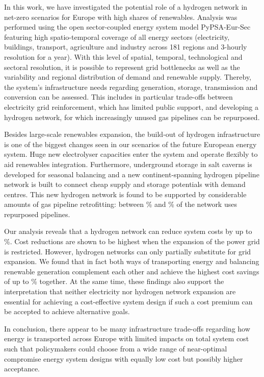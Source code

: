 In this work, we have investigated the potential role of a hydrogen network in net-zero
\co scenarios for Europe with high shares of renewables. Analysis was performed
using the open sector-coupled energy system model PyPSA-Eur-Sec featuring high
spatio-temporal coverage of all energy sectors (electricity, buildings,
transport, agriculture and industry across 181 regions and 3-hourly resolution
for a year). With this level of spatial, temporal, technological and sectoral
resolution, it is possible to represent grid bottlenecks as well as the
variability and regional distribution of demand and renewable supply. Thereby,
the system's infrastructure needs regarding generation, storage, transmission
and conversion can be assessed. This includes in particular trade-offs between
electricity grid reinforcement, which has limited public support, and developing
a hydrogen network, for which increasingly unused gas pipelines can be
repurposed.

Besides large-scale renewables expansion, the build-out of hydrogen
infrastructure is one of the biggest changes seen in our scenarios of the future
European energy system. Huge new electrolyser capacities enter the system and
operate flexibly to aid renewables integration. Furthermore, underground storage
in salt caverns is developed for seasonal balancing and a new continent-spanning
hydrogen pipeline network is built to connect cheap supply and storage
potentials with demand centres. This new hydrogen network is found to be
supported by considerable amounts of gas pipeline retrofitting: between \minretroshare\% and
\maxretroshare\% of the network uses repurposed pipelines.

Our analysis reveals that a hydrogen network can reduce system costs by up to
\maxhybenefitrel\%. Cost reductions are shown to be highest when the expansion of the power grid is
restricted. However, hydrogen networks can only partially substitute for grid
expansion. We found that in fact both ways of transporting energy and balancing
renewable generation complement each other and achieve the highest cost savings
of up to \gridbenefitrel\% together. At the same time, these findings also support the
interpretation that neither electricity nor hydrogen network expansion are
essential for achieving a cost-effective system design if such a cost premium
can be accepted to achieve alternative goals.

In conclusion, there appear to be many infrastructure trade-offs regarding how
energy is transported across Europe with limited impacts on total system cost
such that policymakers could choose from a wide range of near-optimal compromise
energy system designs with equally low cost but possibly higher acceptance.

